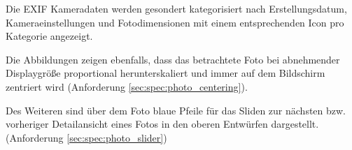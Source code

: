 Die EXIF Kameradaten werden gesondert kategorisiert nach Erstellungsdatum, Kameraeinstellungen und Fotodimensionen mit einem entsprechenden Icon pro Kategorie angezeigt.

Die Abbildungen zeigen ebenfalls, dass das betrachtete Foto bei abnehmender Displaygröße proportional herunterskaliert und immer auf dem Bildschirm zentriert wird (Anforderung \ref{sec:spec:photo_centering}).

Des Weiteren sind über dem Foto blaue Pfeile für das Sliden zur nächsten bzw. vorheriger Detailansicht eines Fotos in den oberen Entwürfen dargestellt. (Anforderung \ref{sec:spec:photo_slider})
